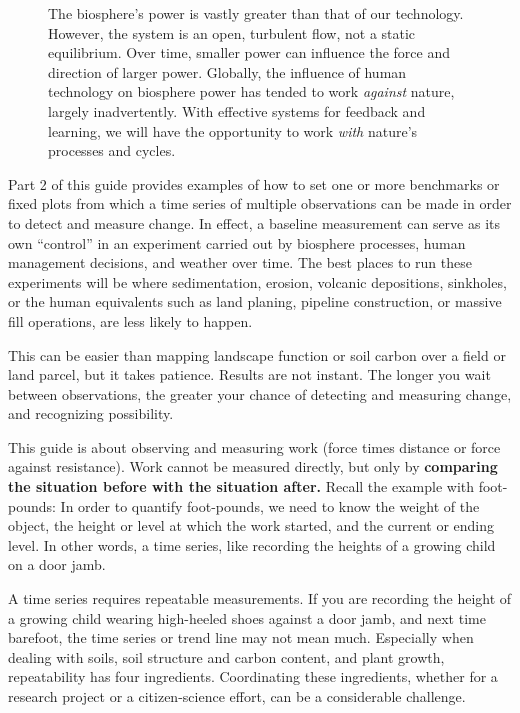 \documentclass[11pt,letterpaper,twoside,onecolumn]{memoir}
\begin{document}
\begin{wrapfigure}{R}{6cm}
\centering
\vspace{-2em}
\caption*{The biosphere's power is vastly greater than that of our technology. However, the system is an open, turbulent flow, not a static equilibrium. Over time, smaller power can influence the force and direction of larger power. Globally, the influence of human technology on biosphere power has tended to work \textit{against} nature, largely inadvertently. With effective systems for feedback and learning, we will have the opportunity to work \textit{with} nature's processes and cycles.}
\end{wrapfigure}

Part 2 of this guide provides examples of how to set one or more benchmarks or fixed plots from which a time series of multiple observations can be made in order to detect and measure change. In effect, a baseline measurement can serve as its own ``control'' in an experiment carried out by biosphere processes, human management decisions, and weather over time. The best places to run these experiments will be where sedimentation, erosion, volcanic depositions, sinkholes, or the human equivalents such as land planing, pipeline construction, or massive fill operations, are less likely to happen.

This can be easier than mapping landscape function or soil carbon over a field or land parcel, but it takes patience. Results are not instant. The longer you wait between observations, the greater your chance of detecting and measuring change, and recognizing possibility.

This guide is about observing and measuring work (force times distance or force against resistance). Work cannot be measured directly, but only by \textbf{comparing the situation before with the situation after.} Recall the example with foot-pounds: In order to quantify foot-pounds, we need to know the weight of the object, the height or level at which the work started, and the current or ending level. In other words, a time series, like recording the heights of a growing child on a door jamb.

A time series requires repeatable measurements. If you are recording the height of a growing child wearing high-heeled shoes against a door jamb, and next time barefoot, the time series or trend line may not mean much. Especially when dealing with soils, soil structure and carbon content, and plant growth, repeatability has four ingredients. Coordinating these ingredients, whether for a research project or a citizen-science effort, can be a considerable challenge.
\end{document}
